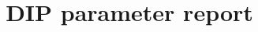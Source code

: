 \documentclass{article}
\begin{document}
\title{DIP parameter report}
\date{}
\maketitle
\end{document}
